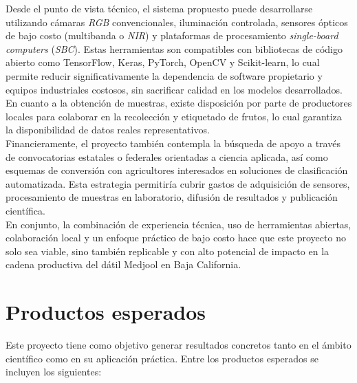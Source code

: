 Desde el punto de vista técnico, el sistema propuesto puede desarrollarse utilizando cámaras \textit{RGB} convencionales, iluminación controlada, sensores ópticos de bajo costo (multibanda o \textit{NIR}) y plataformas de procesamiento \textit{single-board computers} (\textit{SBC}). Estas herramientas son compatibles con bibliotecas de código abierto como TensorFlow, Keras, PyTorch, OpenCV y Scikit-learn, lo cual permite reducir significativamente la dependencia de software propietario y equipos industriales costosos, sin sacrificar calidad en los modelos desarrollados.\\

En cuanto a la obtención de muestras, existe disposición por parte de productores locales para colaborar en la recolección y etiquetado de frutos, lo cual garantiza la disponibilidad de datos reales representativos.\\

Financieramente, el proyecto también contempla la búsqueda de apoyo a través de convocatorias estatales o federales orientadas a ciencia aplicada, así como esquemas de conversión con agricultores interesados en soluciones de clasificación automatizada. Esta estrategia permitiría cubrir gastos de adquisición de sensores, procesamiento de muestras en laboratorio, difusión de resultados y publicación científica.\\

En conjunto, la combinación de experiencia técnica, uso de herramientas abiertas, colaboración local y un enfoque práctico de bajo costo hace que este proyecto no solo sea viable, sino también replicable y con alto potencial de impacto en la cadena productiva del dátil Medjool en Baja California.

\section{Productos esperados}

Este proyecto tiene como objetivo generar resultados concretos tanto en el ámbito científico como en su aplicación práctica. Entre los productos esperados se incluyen los siguientes:

